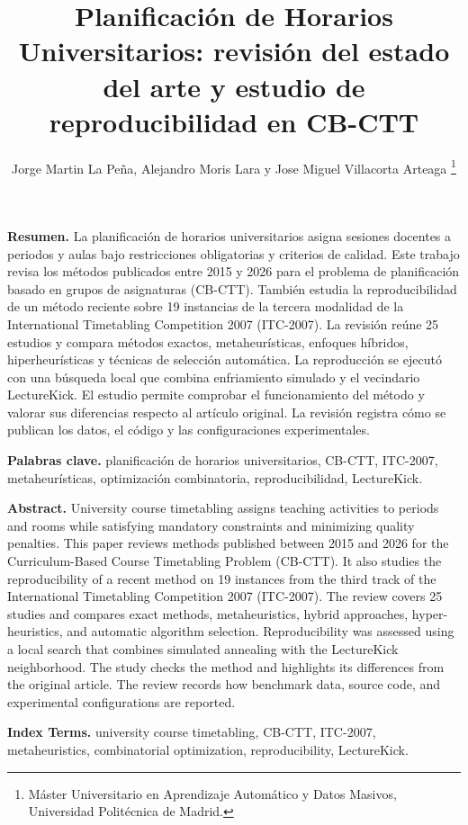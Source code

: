 \documentclass[journal]{IEEEtran}
\title{Planificación de Horarios Universitarios: revisión del estado del arte y estudio de reproducibilidad en CB-CTT}
\author{Jorge Martin La Peña, Alejandro Moris Lara y Jose Miguel Villacorta Arteaga%
\thanks{Máster Universitario en Aprendizaje Automático y Datos Masivos, Universidad Politécnica de Madrid.}}
\begin{document}
\maketitle



\begin{center}\begin{minipage}{\columnwidth}\small\textbf{Resumen.} La planificación de horarios universitarios asigna sesiones docentes a periodos y aulas bajo restricciones obligatorias y criterios de calidad. Este trabajo revisa los métodos publicados entre 2015 y 2026 para el problema de planificación basado en grupos de asignaturas (CB-CTT). También estudia la reproducibilidad de un método reciente sobre 19 instancias de la tercera modalidad de la International Timetabling Competition 2007 (ITC-2007). La revisión reúne 25 estudios y compara métodos exactos, metaheurísticas, enfoques híbridos, hiperheurísticas y técnicas de selección automática. La reproducción se ejecutó con una búsqueda local que combina enfriamiento simulado y el vecindario LectureKick. El estudio permite comprobar el funcionamiento del método y valorar sus diferencias respecto al artículo original. La revisión registra cómo se publican los datos, el código y las configuraciones experimentales.\par\vspace{0.35em}\textbf{Palabras clave.} planificación de horarios universitarios, CB-CTT, ITC-2007, metaheurísticas, optimización combinatoria, reproducibilidad, LectureKick.\end{minipage}\end{center}


\begin{center}\begin{minipage}{\columnwidth}\small\textbf{Abstract.} University course timetabling assigns teaching activities to periods and rooms while satisfying mandatory constraints and minimizing quality penalties. This paper reviews methods published between 2015 and 2026 for the Curriculum-Based Course Timetabling Problem (CB-CTT). It also studies the reproducibility of a recent method on 19 instances from the third track of the International Timetabling Competition 2007 (ITC-2007). The review covers 25 studies and compares exact methods, metaheuristics, hybrid approaches, hyper-heuristics, and automatic algorithm selection. Reproducibility was assessed using a local search that combines simulated annealing with the LectureKick neighborhood. The study checks the method and highlights its differences from the original article. The review records how benchmark data, source code, and experimental configurations are reported.\par\vspace{0.35em}\textbf{Index Terms.} university course timetabling, CB-CTT, ITC-2007, metaheuristics, combinatorial optimization, reproducibility, LectureKick.\end{minipage}\end{center}
\end{document}
